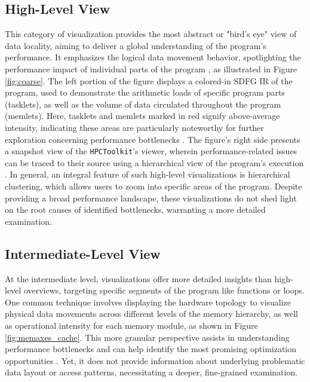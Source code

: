 \subsection{High-Level View}\label{sec:coarse_view}
This category of visualization provides the most abstract or "bird's eye" view of data locality, aiming to deliver a global understanding of the program's performance. It emphasizes the logical data movement behavior, spotlighting the performance impact of individual parts of the program \cite{schaad2021boosting,schaad2022boosting,gimenez2017memaxes,adhianto2010hpctoolkit}, as illustrated in Figure \ref{fig:coarse}. The left portion of the figure displays a colored-in SDFG IR of the program, used to demonstrate the arithmetic loads of specific program parts (tasklets), as well as the volume of data circulated throughout the program (memlets). Here, tasklets and memlets marked in red signify above-average intensity, indicating these areas are particularly noteworthy for further exploration concerning performance bottlenecks \cite{schaad2021boosting}. The figure's right side presents a snapshot view of the \texttt{HPCToolkit}'s viewer, wherein performance-related issues can be traced to their source using a hierarchical view of the program's execution \cite{adhianto2010hpctoolkit}. In general, an integral feature of such high-level visualizations is hierarchical clustering, which allows users to zoom into specific areas of the program. Despite providing a broad performance landscape, these visualizations do not shed light on the root causes of identified bottlenecks, warranting a more detailed examination.

\subsection{Intermediate-Level View}\label{sec:medium_view}
At the intermediate level, visualizations offer more detailed insights than high-level overviews, targeting specific segments of the program like functions or loops. One common technique involves displaying the hardware topology to visualize physical data movements across different levels of the memory hierarchy, as well as operational intensity for each memory module, as shown in Figure \ref{fig:memaxes_cache}. This more granular perspective assists in understanding performance bottlenecks and can help identify the most promising optimization opportunities \cite{gimenez2017memaxes,choudhury2011abstract}. Yet, it does not provide information about underlying problematic data layout or access patterns, necessitating a deeper, fine-grained examination.

